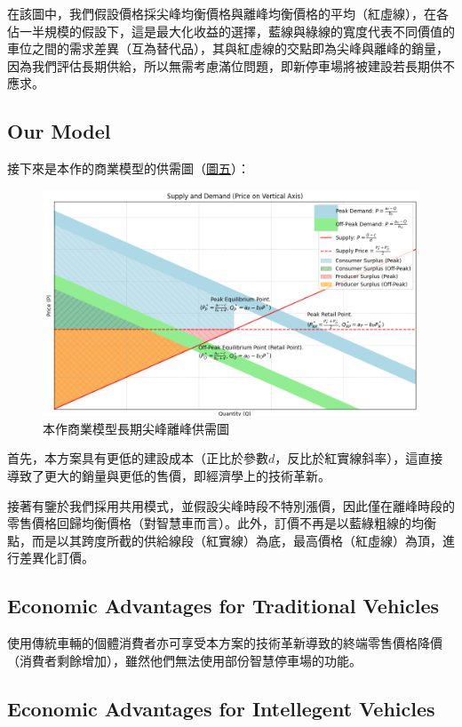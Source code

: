 \documentclass[sigconf,authorversion,nonacm,screen]{acmart}
\begin{document}
在該圖中，我們假設價格採尖峰均衡價格與離峰均衡價格的平均（紅虛線），在各佔一半規模的假設下，這是最大化收益的選擇，藍線與綠線的寬度代表不同價值的車位之間的需求差異（互為替代品），其與紅虛線的交點即為尖峰與離峰的銷量，因為我們評估長期供給，所以無需考慮滿位問題，即新停車場將被建設若長期供不應求。

\subsection{Our Model}

\quad 接下來是本作的商業模型的供需圖（\hyperref[fig:OM]{圖五}）：

\begin{figure}[h]
    \centering
    \includegraphics[width=1.0\linewidth]{OM.png}
    \caption{本作商業模型長期尖峰離峰供需圖}
    \label{fig:OM}
\end{figure}

首先，本方案具有更低的建設成本（正比於參數\(d\)，反比於紅實線斜率），這直接導致了更大的銷量與更低的售價，即經濟學上的技術革新。

接著有鑒於我們採用共用模式，並假設尖峰時段不特別漲價，因此僅在離峰時段的零售價格回歸均衡價格（對智慧車而言）。此外，訂價不再是以藍綠粗線的均衡點，而是以其跨度所截的供給線段（紅實線）為底，最高價格（紅虛線）為頂，進行差異化訂價。

\subsection{Economic Advantages for Traditional Vehicles}
\label{sec:ET}

\quad 使用傳統車輛的個體消費者亦可享受本方案的技術革新導致的終端零售價格降價（消費者剩餘增加），雖然他們無法使用部份智慧停車場的功能。

\subsection{Economic Advantages for Intellegent Vehicles}
\end{document}
